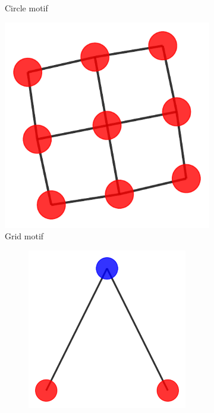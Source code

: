 \begin{figure}[h]
\begin{subfigure}[b]{0.2\textwidth}
        \caption{Circle motif}
    \end{subfigure}
    \begin{subfigure}[b]{0.2\textwidth}
        \includegraphics[width=\linewidth]{img/Motif_Vis/Tree-Grid-MOTIF.pdf}
        \caption{Grid motif}
    \end{subfigure}
    \begin{subfigure}[b]{0.30\textwidth}
        \centering
        \begin{subfigure}[b]{0.48\linewidth}
            \includegraphics[width=\linewidth]{img/Motif_Vis/MUTAG-MOTIF1.pdf}

\end{subfigure}
\end{subfigure}
\end{figure}
